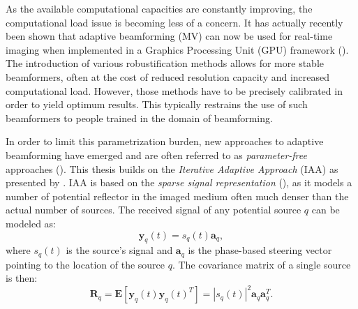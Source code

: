 As the available computational capacities are constantly improving, the computational load issue is becoming less of a concern. It has actually recently been shown that adaptive beamforming (MV) can now be used for real-time imaging when implemented in a Graphics Processing Unit (GPU) framework (\cite{GPU}).
The introduction of various robustification methods allows for more stable beamformers, often at the cost of reduced resolution capacity and increased computational load. However, those methods have to be precisely calibrated in order to yield optimum results. This typically restrains the use of such beamformers to people trained in the domain of beamforming.

In order to limit this parametrization burden, new approaches to adaptive beamforming have emerged and are often referred to as \textit{parameter-free} approaches (\cite{Yardibi_nonparametric_IAA, Yardibi, Du_parameter_free, Jensen_IAA}). This thesis builds on the \textit{Iterative Adaptive Approach} (IAA) as presented by \cite{Jensen_IAA}. IAA is based on the \textit{sparse signal representation} (\cite{Yardibi_nonparametric_IAA}), as it models a number of potential reflector in the imaged medium often much denser than the actual number of sources. The received signal of any potential source $q$ can be modeled as:
\begin{equation}
    \boldsymbol{y}_q(t) = s_q(t)  \boldsymbol{a}_q,
\end{equation}
\noindent
where $s_q(t)$ is the source's signal and $\boldsymbol{a}_q$ is the phase-based steering vector pointing to the location of the source $q$. The covariance matrix of a single source is then:
\begin{equation}
    \boldsymbol{R}_q = \boldsymbol{E}[\boldsymbol{y}_q(t) \boldsymbol{y}_q(t)^T] = |s_q(t)|^2 \boldsymbol{a}_q \boldsymbol{a}_q^T.
\end{equation}

